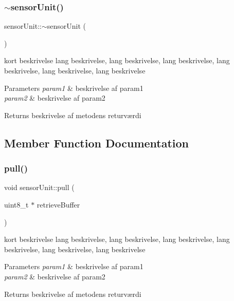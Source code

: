 \subsubsection{\texorpdfstring{$\sim$sensor\+Unit()}{~sensorUnit()}}
{\footnotesize\ttfamily sensor\+Unit\+::$\sim$sensor\+Unit (\begin{DoxyParamCaption}{ }\end{DoxyParamCaption})}



kort beskrivelse lang beskrivelse, lang beskrivelse, lang beskrivelse, lang beskrivelse, lang beskrivelse, lang beskrivelse 


\begin{DoxyParams}{Parameters}
{\em param1} & beskrivelse af param1 \\
\hline
{\em param2} & beskrivelse af param2 \\
\hline
\end{DoxyParams}
\begin{DoxyReturn}{Returns}
beskrivelse af metodens returværdi 
\end{DoxyReturn}


\subsection{Member Function Documentation}
\mbox{\label{classsensorUnit_ad5a61b8eb08a866d7a94c7bb4149a172}} 
\subsubsection{\texorpdfstring{pull()}{pull()}}
{\footnotesize\ttfamily void sensor\+Unit\+::pull (\begin{DoxyParamCaption}\item[{uint8\+\_\+t $\ast$}]{retrieve\+Buffer }\end{DoxyParamCaption})}



kort beskrivelse lang beskrivelse, lang beskrivelse, lang beskrivelse, lang beskrivelse, lang beskrivelse, lang beskrivelse 


\begin{DoxyParams}{Parameters}
{\em param1} & beskrivelse af param1 \\
\hline
{\em param2} & beskrivelse af param2 \\
\hline
\end{DoxyParams}
\begin{DoxyReturn}{Returns}
beskrivelse af metodens returværdi 
\end{DoxyReturn}
\mbox{\label{classsensorUnit_aeb3f83f3e41d1a23974cf9d8537cf3f6}} 
